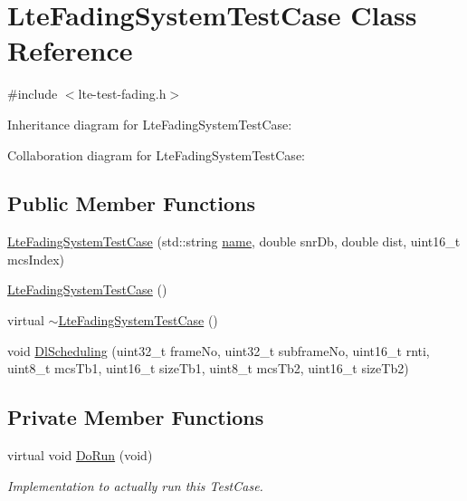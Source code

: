 \hypertarget{classLteFadingSystemTestCase}{}\section{Lte\+Fading\+System\+Test\+Case Class Reference}
\label{classLteFadingSystemTestCase}


{\ttfamily \#include $<$lte-\/test-\/fading.\+h$>$}



Inheritance diagram for Lte\+Fading\+System\+Test\+Case\+:


Collaboration diagram for Lte\+Fading\+System\+Test\+Case\+:
\subsection*{Public Member Functions}
\begin{DoxyCompactItemize}
\item 
\hyperlink{classLteFadingSystemTestCase_a567b238c5d0ad6ca35b2e6ea33c6c79a}{Lte\+Fading\+System\+Test\+Case} (std\+::string \hyperlink{generate__test__data__lte__spectrum__model_8m_ab74e6bf80237ddc4109968cedc58c151}{name}, double snr\+Db, double dist, uint16\+\_\+t mcs\+Index)
\item 
\hyperlink{classLteFadingSystemTestCase_ab848de0518ea61bb6487ec9f368ff60d}{Lte\+Fading\+System\+Test\+Case} ()
\item 
virtual \hyperlink{classLteFadingSystemTestCase_a89118d785370716f9a0899550682332b}{$\sim$\+Lte\+Fading\+System\+Test\+Case} ()
\item 
void \hyperlink{classLteFadingSystemTestCase_a57382df4ca137d9b9b7005089c81d559}{Dl\+Scheduling} (uint32\+\_\+t frame\+No, uint32\+\_\+t subframe\+No, uint16\+\_\+t rnti, uint8\+\_\+t mcs\+Tb1, uint16\+\_\+t size\+Tb1, uint8\+\_\+t mcs\+Tb2, uint16\+\_\+t size\+Tb2)
\end{DoxyCompactItemize}
\subsection*{Private Member Functions}
\begin{DoxyCompactItemize}
\item 
virtual void \hyperlink{classLteFadingSystemTestCase_ab44f904936c8f5ba915e57f4b61e7ab2}{Do\+Run} (void)
\begin{DoxyCompactList}\small\item\em Implementation to actually run this Test\+Case. \end{DoxyCompactList}\end{DoxyCompactItemize}
